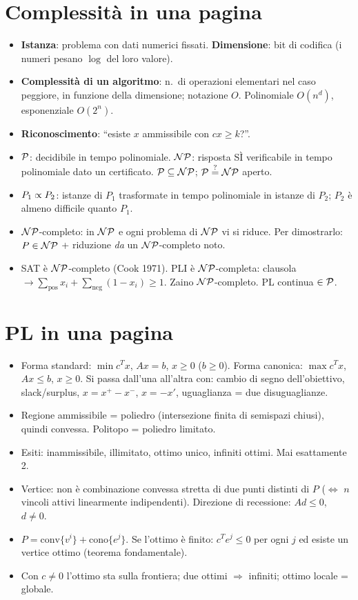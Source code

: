 \section*{Complessità in una pagina}
\begin{itemize}[nosep]
\item \textbf{Istanza}: problema con dati numerici fissati. \textbf{Dimensione}: bit di codifica (i numeri pesano $\log$ del loro valore).
\item \textbf{Complessità di un algoritmo}: n.\ di operazioni elementari nel caso peggiore, in funzione della dimensione; notazione $O$. Polinomiale $O(n^d)$, esponenziale $O(2^n)$.
\item \textbf{Riconoscimento}: ``esiste $x$ ammissibile con $cx\ge k$?''.
\item $\mathcal{P}$: decidibile in tempo polinomiale. $\mathcal{NP}$: risposta SÌ verificabile in tempo polinomiale dato un certificato. $\mathcal{P}\subseteq\mathcal{NP}$; $\mathcal{P}\overset{?}{=}\mathcal{NP}$ aperto.
\item $P_1\propto P_2$: istanze di $P_1$ trasformate in tempo polinomiale in istanze di $P_2$; $P_2$ è almeno difficile quanto $P_1$.
\item $\mathcal{NP}$-completo: in $\mathcal{NP}$ e ogni problema di $\mathcal{NP}$ vi si riduce. Per dimostrarlo: $P\in\mathcal{NP}$ + riduzione \emph{da} un $\mathcal{NP}$-completo noto.
\item SAT è $\mathcal{NP}$-completo (Cook 1971). PLI è $\mathcal{NP}$-completa: clausola $\to\sum_{\text{pos}}x_i+\sum_{\text{neg}}(1-x_i)\ge1$. Zaino $\mathcal{NP}$-completo. PL continua $\in\mathcal{P}$.
\end{itemize}

\section*{PL in una pagina}
\begin{itemize}[nosep]
\item Forma standard: $\min c^Tx$, $Ax=b$, $x\ge0$ ($b\ge0$). Forma canonica: $\max c^Tx$, $Ax\le b$, $x\ge0$. Si passa dall'una all'altra con: cambio di segno dell'obiettivo, slack/surplus, $x=x^+-x^-$, $x=-x'$, uguaglianza = due disuguaglianze.
\item Regione ammissibile = poliedro (intersezione finita di semispazi chiusi), quindi convessa. Politopo = poliedro limitato.
\item Esiti: inammissibile, illimitato, ottimo unico, infiniti ottimi. Mai esattamente 2.
\item Vertice: non è combinazione convessa stretta di due punti distinti di $P$ ($\Leftrightarrow$ $n$ vincoli attivi linearmente indipendenti). Direzione di recessione: $Ad\le0$, $d\ne0$.
\item $P=\mathrm{conv}\{v^i\}+\mathrm{cono}\{e^j\}$. Se l'ottimo è finito: $c^Te^j\le0$ per ogni $j$ ed esiste un vertice ottimo (teorema fondamentale).
\item Con $c\ne0$ l'ottimo sta sulla frontiera; due ottimi $\Rightarrow$ infiniti; ottimo locale = globale.
\end{itemize}

